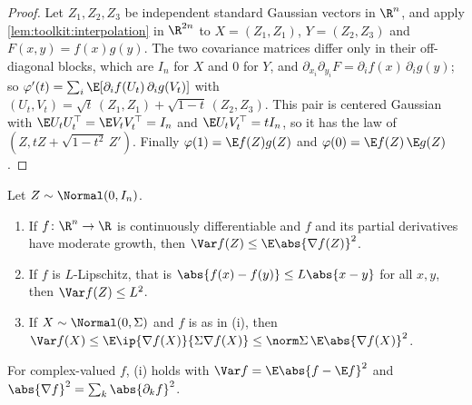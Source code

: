 \begin{refsection}
\begin{proof}
Let $Z_1,Z_2,Z_3$ be independent standard Gaussian vectors in $\R^n$, and apply \cref{lem:toolkit:interpolation} in $\R^{2n}$ to $X=(Z_1,Z_1)$, $Y=(Z_2,Z_3)$ and $F(x,y)=f(x)g(y)$. The two covariance matrices differ only in their off-diagonal blocks, which are $I_n$ for $X$ and $0$ for $Y$, and $\partial_{x_i}\partial_{y_i}F=\partial_if(x)\,\partial_ig(y)$; so $\varphi'(t)=\sum_i\E[\partial_if(U_t)\,\partial_ig(V_t)]$ with $(U_t,V_t)=\sqrt t\,(Z_1,Z_1)+\sqrt{1-t}\,(Z_2,Z_3)$. This pair is centered Gaussian with $\E U_tU_t^\top=\E V_tV_t^\top=I_n$ and $\E U_tV_t^\top=tI_n$, so it has the law of $(Z,tZ+\sqrt{1-t^2}\,Z')$. Finally $\varphi(1)=\E f(Z)g(Z)$ and $\varphi(0)=\E f(Z)\,\E g(Z)$.
\end{proof}

\begin{theorem}\label{thm:toolkit:poincare}
Let $Z\sim\Normal(0,I_n)$.
\begin{enumerate}
\item If $f\colon\R^n\to\R$ is continuously differentiable and $f$ and its partial derivatives have moderate growth, then $\Var f(Z)\le\E\abs{\nabla f(Z)}^2$.
\item If $f$ is $L$-Lipschitz, that is $\abs{f(x)-f(y)}\le L\abs{x-y}$ for all $x,y$, then $\Var f(Z)\le L^2$.
\item If $X\sim\Normal(0,\Sigma)$ and $f$ is as in (i), then $\Var f(X)\le\E\ip{\nabla f(X)}{\Sigma\nabla f(X)}\le\norm\Sigma\,\E\abs{\nabla f(X)}^2$.
\end{enumerate}
For complex-valued $f$, (i) holds with $\Var f=\E\abs{f-\E f}^2$ and $\abs{\nabla f}^2=\sum_k\abs{\partial_kf}^2$.
\end{theorem}


\end{refsection}
